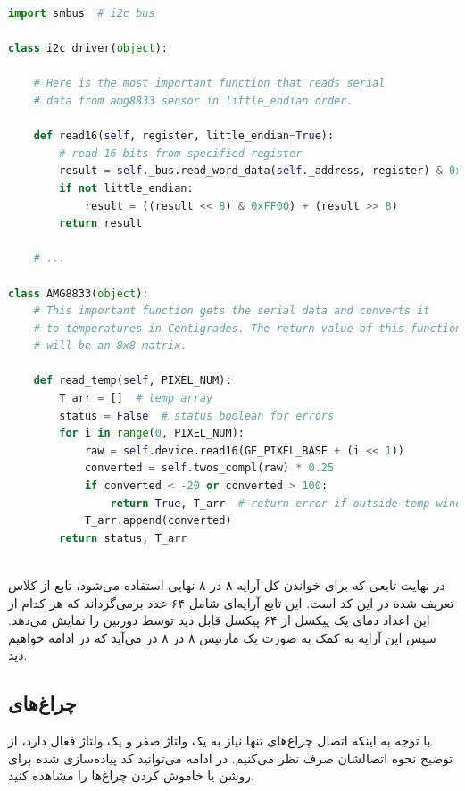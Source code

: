 \begin{latin}
\begin{lstlisting}[language=python]
import smbus  # i2c bus

class i2c_driver(object):
    
    # Here is the most important function that reads serial
    # data from amg8833 sensor in little_endian order.

    def read16(self, register, little_endian=True):
        # read 16-bits from specified register
        result = self._bus.read_word_data(self._address, register) & 0xFFFF
        if not little_endian:
            result = ((result << 8) & 0xFF00) + (result >> 8)
        return result

    # ...

class AMG8833(object):
    # This important function gets the serial data and converts it 
    # to temperatures in Centigrades. The return value of this function
    # will be an 8x8 matrix.
    
    def read_temp(self, PIXEL_NUM):
        T_arr = []  # temp array
        status = False  # status boolean for errors
        for i in range(0, PIXEL_NUM):
            raw = self.device.read16(GE_PIXEL_BASE + (i << 1))
            converted = self.twos_compl(raw) * 0.25
            if converted < -20 or converted > 100:
                return True, T_arr  # return error if outside temp window
            T_arr.append(converted)
        return status, T_arr



\end{lstlisting}
\end{latin}

در نهایت تابعی که برای خواندن کل آرایه ۸ در ۸ نهایی استفاده می‌شود، تابع  از کلاس تعریف شده در این کد است. این تابع آرایه‌ای شامل ۶۴ عدد  برمی‌گرداند که هر کدام از این اعداد دمای یک پیکسل از ۶۴ پیکسل قابل دید توسط دوربین را نمایش می‌دهد. سپس این آرایه به کمک  به صورت یک مارتیس ۸ در ۸ در می‌آید که در ادامه خواهیم دید.


\subsection{چراغ‌های }
با توجه به اینکه اتصال چراغ‌های  تنها نیاز به یک ولتاژ صفر و یک ولتاژ فعال دارد، از توضیح نحوه اتصالشان صرف نظر می‌کنیم. در ادامه‌ می‌توانید کد پیاده‌سازی شده برای روشن یا خاموش کردن چراغ‌ها را مشاهده کنید.

